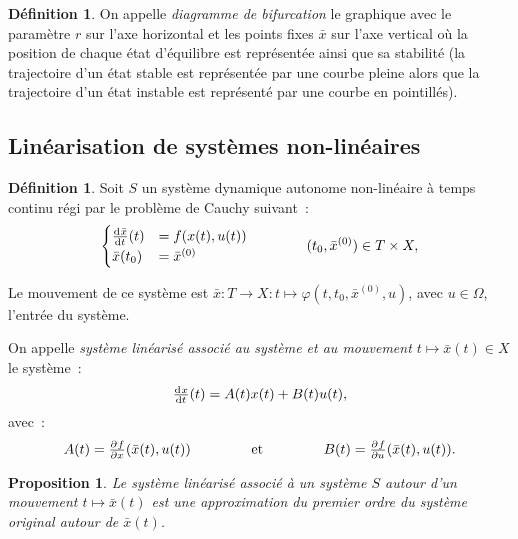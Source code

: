 \documentclass{article}
\newtheorem{prp}[thm]{Proposition}
\theoremstyle{definition}
\newtheorem{déf}[thm]{Définition}
\theoremstyle{remark}
\begin{document}
	\begin{déf} On appelle \textit{diagramme de bifurcation} le graphique avec le paramètre $r$ sur l'axe horizontal et les points fixes $\bar x$ sur l'axe
	vertical où la position de chaque état d'équilibre est représentée ainsi que sa stabilité (la trajectoire d'un état stable est représentée par une courbe
	pleine alors que la trajectoire d'un état instable est représenté par une courbe en pointillés).
	\end{déf}

	\subsection{Linéarisation de systèmes non-linéaires}

	\begin{déf} Soit $S$ un système dynamique autonome non-linéaire à temps continu régi par le problème de Cauchy suivant~:
	\[\begin{cases}
		\od {\bar x}t(t) &= f(x(t), u(t)) \\
		\bar x(t_0) &= {\bar x}^{(0)}
	\end{cases}\qquad\qquad (t_0, {\bar x}^{(0)}) \in T \times X,\]

	Le mouvement de ce système est $\bar x : T \to X : t \mapsto \varphi(t, t_0, {\bar x}^{(0)}, u)$, avec $u \in \Omega$, l'entrée du système.

	On appelle \textit{système linéarisé associé au système et au mouvement $t \mapsto \bar x(t) \in X$} le système~:
	\[\od xt(t) = A(t)x(t) + B(t)u(t),\]
	avec~:
	\[A(t) = \pd fx(\bar x(t), u(t)) \qquad\qquad \text{ et } \qquad\qquad B(t) = \pd fu(\bar x(t), u(t)).\]
	\end{déf}

	\begin{prp} Le système linéarisé associé à un système $S$ autour d'un mouvement $t \mapsto \bar x(t)$ est une approximation du premier
	ordre du système original autour de $\bar x(t)$.
	\end{prp}
\end{document}
